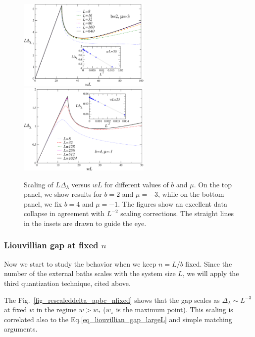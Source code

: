 \begin{figure}[!b]
    \centering
    \includegraphics[width=6.4cm]{imm/scalingDeltaapbc.pdf}
    \includegraphics[width=6.4cm]{imm/scalingDelta4bmuminus1.pdf}
    \caption{Scaling of $L \Delta_\lambda$ versus $w L$ for different values of $b$ and $\mu$. On the top panel, we show results for $b=2$ and $\mu=-3$, while on the bottom panel, we fix $b=4$ and $\mu=-1$. The figures show an excellent data collapse in agreement with $L^{-2}$ scaling corrections. The straight lines in the insets are drawn to guide the eye.}
    \label{fig_scaling_delta_apbc}
\end{figure}



\subsubsection{Liouvillian gap at fixed $n$}
\label{sec_liouvillian_gap_fixed_n}

Now we start to study the behavior when we keep $n=L/b$ fixed. Since the number of the
external baths scales with the system size $L$, we will apply the third quantization 
technique, cited above.

The Fig.~\ref{fig_rescaleddelta_apbc_nfixed} shows that the gap scales as  
$\Delta_\lambda\sim L^{-3}$ at fixed $w$ in the regime $w>w_*$ ($w_\star$ is the maximum
point). This scaling is correlated also to the Eq.\eqref{eq_liouvillian_gap_largeL} and
simple matching arguments.\\



